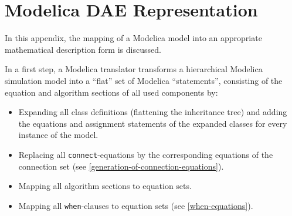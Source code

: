 \chapter{Modelica DAE Representation}\label{modelica-dae-representation}

In this appendix, the mapping of a Modelica model into an appropriate
mathematical description form is discussed.

In a first step, a Modelica translator transforms a hierarchical
Modelica simulation model into a ``flat'' set of Modelica
``statements'', consisting of the equation and algorithm sections of all
used components by:
\begin{itemize}
\item
  Expanding all class definitions (flattening the inheritance tree) and
  adding the equations and assignment statements of the expanded classes
  for every instance of the model.
\item
  Replacing all \lstinline!connect!-equations by the corresponding equations of the connection set (see \cref{generation-of-connection-equations}).
\item
  Mapping all algorithm sections to equation sets.
\item
  Mapping all \lstinline!when!-clauses to equation sets (see \cref{when-equations}).
\end{itemize}

